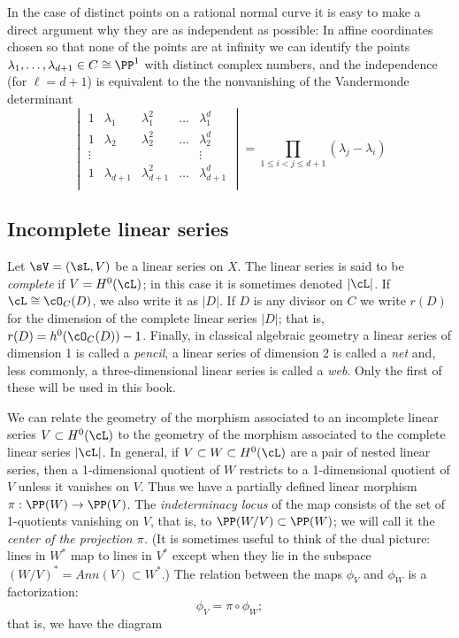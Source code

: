 In the case of distinct points on a rational normal curve
it is easy to make a direct argument why they are as independent as possible: In affine coordinates chosen so that none of the points are
at infinity we can identify the points $\lambda_1,\dots,\lambda_{d+1} \in C \cong \PP^1$ with distinct complex numbers, and the independence (for $\ell = d+1$) is equivalent to the the nonvanishing of the Vandermonde determinant
$$
\begin{vmatrix}
1 & \lambda_1 & \lambda_1^2 & \dots & \lambda_1^d \\
1 & \lambda_2 & \lambda_2^2 & \dots & \lambda_2^d \\
\vdots & & & & \vdots \\
1 & \lambda_{d+1} & \lambda_{d+1}^2 & \dots & \lambda_{d+1}^d \\
\end{vmatrix}
= \prod_{1 \leq i < j \leq d+1} (\lambda_j - \lambda_i)
$$


\subsection{Incomplete linear series}

Let $\sV = (\sL, V)$ be a linear series on $X$.  The linear series is said to be \emph{complete} if $V = H^0(\cL)$; in this case it is sometimes denoted $|\cL|$. If $\cL \cong \cO_C(D)$, we also write it as $|D|$. 
 If $D$ is any divisor on $C$ we write $r(D)$ for the dimension of the complete linear series $|D|$; that is, $r(D) = h^0(\cO_C(D)) - 1$. Finally, in classical algebraic geometry a linear series of dimension 1 is called a \emph{pencil}, a linear series of dimension 2 is called a \emph{net} and, less commonly, a three-dimensional linear series is called a \emph{web}.  Only the first of these will be
 used in this book.

We can relate the geometry of the morphism associated to an incomplete linear series $V \subset H^0(\cL)$ to the geometry of the morphism associated to the complete linear series $|\cL|$. In general, if $V \subset W \subset H^0(\cL)$ are a pair of nested linear series, then a 1-dimensional quotient of $W$ restricts to a 1-dimensional quotient of $V$ unless it vanishes on $V$.
Thus we have a partially defined linear morphism $\pi: \PP(W)  \to \PP(V)$. The \emph{indeterminacy locus} of the map
consists of the set of 1-quotients vanishing on $V$, that is, to $\PP(W/V) \subset \PP(W)$; we will call it the 
\emph{center of the projection $\pi$.} (It is sometimes useful to
think of the dual picture: lines in $W^*$ map to lines in $V^*$ except when they lie in the subspace $(W/V)^* = Ann(V)\subset W^*$.)
The relation between the maps $\phi_V$ and $\phi_W$ is a factorization:
$$
\phi_V = \pi \circ \phi_W;
$$
that is, we have the diagram 


